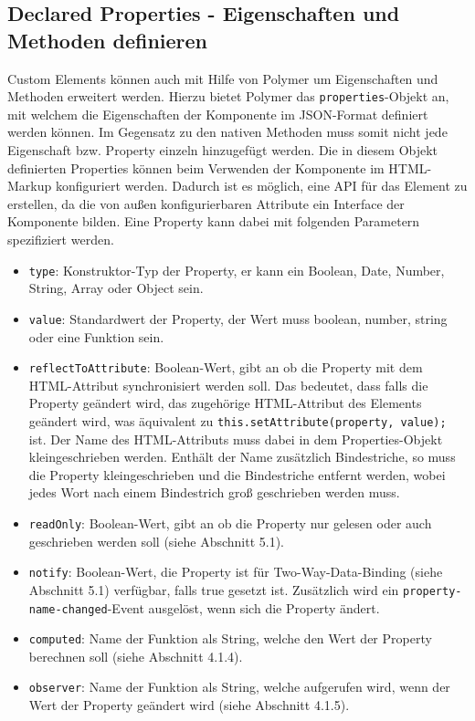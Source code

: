 \subsection{Declared Properties - Eigenschaften und Methoden definieren}\label{declared-properties---eigenschaften-und-methoden-definieren}

Custom Elements können auch mit Hilfe von Polymer um Eigenschaften und Methoden erweitert werden. Hierzu bietet Polymer das \texttt{properties}-Objekt an, mit welchem die Eigenschaften der Komponente im JSON-Format definiert werden können. Im Gegensatz zu den nativen Methoden muss somit nicht jede Eigenschaft bzw. Property einzeln hinzugefügt werden. Die in diesem Objekt definierten Properties können beim Verwenden der Komponente im HTML-Markup konfiguriert werden. Dadurch ist es möglich, eine API für das Element zu erstellen, da die von außen konfigurierbaren Attribute ein Interface der Komponente bilden. Eine Property kann dabei mit folgenden Parametern spezifiziert werden.

\begin{itemize}
\item
  \texttt{type}: Konstruktor-Typ der Property, er kann ein Boolean, Date, Number, String, Array oder Object sein.
\item
  \texttt{value}: Standardwert der Property, der Wert muss boolean, number, string oder eine Funktion sein.
\item
  \texttt{reflectToAttribute}: Boolean-Wert, gibt an ob die Property mit dem HTML-Attribut synchronisiert werden soll. Das bedeutet, dass falls die Property geändert wird, das zugehörige HTML-Attribut des Elements geändert wird, was äquivalent zu \texttt{this.setAttribute(property,\ value);} ist. Der Name des HTML-Attributs muss dabei in dem Properties-Objekt kleingeschrieben werden. Enthält der Name zusätzlich Bindestriche, so muss die Property kleingeschrieben und die Bindestriche entfernt werden, wobei jedes Wort nach einem Bindestrich groß geschrieben werden muss.
\item
  \texttt{readOnly}: Boolean-Wert, gibt an ob die Property nur gelesen oder auch geschrieben werden soll (siehe Abschnitt 5.1).
\item
  \texttt{notify}: Boolean-Wert, die Property ist für Two-Way-Data-Binding (siehe Abschnitt 5.1) verfügbar, falls true gesetzt ist. Zusätzlich wird ein \texttt{property-name-changed}-Event ausgelöst, wenn sich die Property ändert.
\item
  \texttt{computed}: Name der Funktion als String, welche den Wert der Property berechnen soll (siehe Abschnitt 4.1.4).
\item
  \texttt{observer}: Name der Funktion als String, welche aufgerufen wird, wenn der Wert der Property geändert wird (siehe Abschnitt 4.1.5).
\end{itemize}

